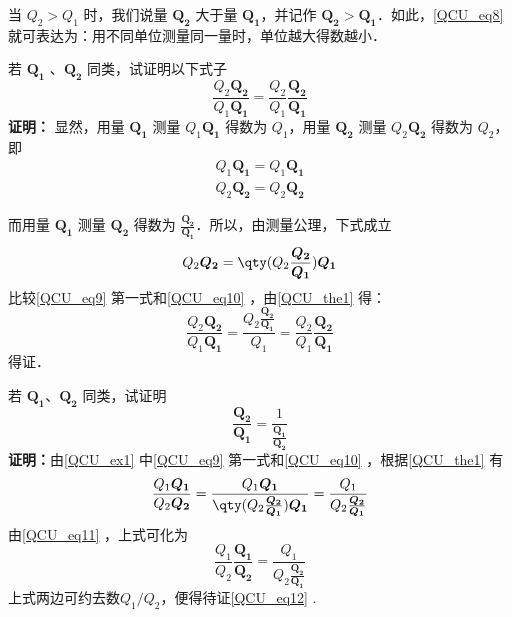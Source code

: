 当 $Q_2>Q_1$ 时，我们说量 $\boldsymbol{Q_2}$ 大于量 $\boldsymbol{Q_1}$，并记作 $\boldsymbol{Q_2}>\boldsymbol{Q_1}$．如此，\autoref{QCU_eq8} 就可表达为：用不同单位测量同一量时，单位越大得数越小．
\begin{example}{}\label{QCU_ex1}
若 $\boldsymbol{Q_1}$ 、$\boldsymbol{Q_2}$ 同类，试证明以下式子
\begin{equation}\label{QCU_eq11}
\frac{Q_2\boldsymbol{Q_2}}{Q_1\boldsymbol{Q_1}}=\frac{Q_2}{Q_1}\frac{\boldsymbol{Q_2}}{\boldsymbol{Q_1}}
\end{equation}
\textbf{证明：} 显然，用量 $\boldsymbol{Q_1}$ 测量 $Q_1\boldsymbol{Q_1}$ 得数为 $Q_1$，用量 $\boldsymbol{Q_2}$ 测量 $Q_2\boldsymbol{Q_2}$ 得数为 $Q_2$，即
\begin{equation}\label{QCU_eq9}
\begin{aligned}
Q_1\boldsymbol{Q_1}=Q_1\boldsymbol{Q_1}\\
Q_2\boldsymbol{Q_2}=Q_2\boldsymbol{Q_2}
\end{aligned}
\end{equation}


而用量 $\boldsymbol{Q_1}$ 测量 $\boldsymbol{Q_2}$ 得数为 $\frac{\boldsymbol{Q_2}}{\boldsymbol{Q_1}}$．所以，由测量公理，下式成立
\begin{equation}\label{QCU_eq10}
Q_2\boldsymbol{Q_2}=\qty(Q_2\frac{\boldsymbol{Q_2}}{\boldsymbol{Q_1}})\boldsymbol{Q_1}
\end{equation}
比较\autoref{QCU_eq9} 第一式和\autoref{QCU_eq10} ，由\autoref{QCU_the1} 得：
\begin{equation}
\frac{Q_2\boldsymbol{Q_2}}{Q_1\boldsymbol{Q_1}}=\frac{Q_2\frac{\boldsymbol{Q_2}}{\boldsymbol{Q_1}}}{Q_1}=\frac{Q_2}{Q_1}\frac{\boldsymbol{Q_2}}{\boldsymbol{Q_1}}
\end{equation}
得证．
\end{example}
\begin{example}{}\label{QCU_ex2}
若 $\boldsymbol{Q_1}$、$\boldsymbol{Q_2}$ 同类，试证明
\begin{equation}\label{QCU_eq12}
\frac{\boldsymbol{Q_2}}{\boldsymbol{{Q_1}}}=\frac{1}{\frac{\boldsymbol{Q_1}}{\boldsymbol{Q_2}}}
\end{equation}
\textbf{证明：}由\autoref{QCU_ex1} 中\autoref{QCU_eq9} 第一式和\autoref{QCU_eq10} ，根据\autoref{QCU_the1} 有
\begin{equation}
\frac{Q_1\boldsymbol{Q_1}}{Q_2\boldsymbol{Q_2}}=\frac{Q_1\boldsymbol{Q_1}}{\qty(Q_2\frac{\boldsymbol{Q_2}}{\boldsymbol{Q_1}})\boldsymbol{Q_1}}=\frac{Q_1}{Q_2\frac{\boldsymbol{Q_2}}{\boldsymbol{Q_1}}}
\end{equation}
由\autoref{QCU_eq11} ，上式可化为
\begin{equation}
\frac{Q_1}{Q_2}\frac{\boldsymbol{Q_1}}{\boldsymbol{Q_2}}=\frac{Q_1}{Q_2\frac{\boldsymbol{Q_2}}{\boldsymbol{Q_1}}}
\end{equation}
上式两边可约去数$Q_1/Q_2$，便得待证\autoref{QCU_eq12} .
\end{example}
